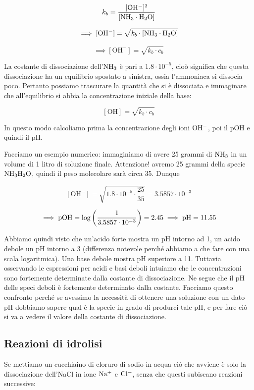 $$k_b= \frac{\rm{[OH^-]^2}}{\rm{[NH_3 \cdot H_2O]}}$$

$$\implies \rm [OH^-] = \sqrt{ \textit{k}_{\textit{b}} \cdot [NH_3 \cdot H_2O]}$$

$$\implies  [\text{OH}^-] = \sqrt{ k_b \cdot c_b}$$

La costante di dissociazione dell'$\rm NH_3$ è pari a $1.8 \cdot 10^{-5}$, cioò significa che questa dissociazione ha un equilibrio spostato a sinistra, ossia l'ammoniaca si dissocia poco. Pertanto possiamo trascurare la quantità che si è dissociata e immaginare che all'equilibrio si abbia la concentrazione iniziale della base:

$$[\text{OH}]=\sqrt{k_b \cdot c_b}$$

In questo modo calcoliamo prima la concentrazione degli ioni $\rm OH^-$, poi il pOH e quindi il pH.

\vspace{0.2cm}Facciamo un esempio numerico: immaginiamo di avere 25 grammi di $\rm NH_3$ in un volume di 1 litro di soluzione finale. Attenzione! avremo 25 grammi della specie $\rm NH_3H_2O$, quindi il peso molecolare sarà circa 35. Dunque

$$[\text{OH}^-]=\sqrt{1.8 \cdot 10^{-5} \cdot \frac{25}{35}}=3.5857 \cdot 10^{-3}$$

$$\implies \rm pOH= \log \left( \frac{1}{3.5857 \cdot 10^{-3}} \right)=2.45 \implies pH=11.55$$

Abbiamo quindi visto che un'acido forte mostra un pH intorno ad 1, un acido debole un pH intorno a 3 (differenza notevole perché abbiamo a che fare con una scala logaritmica). Una base debole mostra pH superiore a 11. Tuttavia osservando le espressioni per acidi e basi deboli intuiamo che le concentrazioni sono fortemente determinate dalla costante di dissociazione. Ne segue che il pH delle speci deboli è fortemente determinato dalla costante. Facciamo questo confronto perché se avessimo la necessità di ottenere una soluzione con un dato pH dobbiamo sapere qual è la specie in grado di produrci tale pH, e per fare ciò si va a vedere il valore della costante di dissociazione.

\subsection{Reazioni di idrolisi}
Se mettiamo un cucchiaino di cloruro di sodio in acqua ciò che avviene è solo la dissociazione dell'NaCl in ione $\rm Na^+$ e $\rm Cl^-$, senza che questi subiscano reazioni successive:

